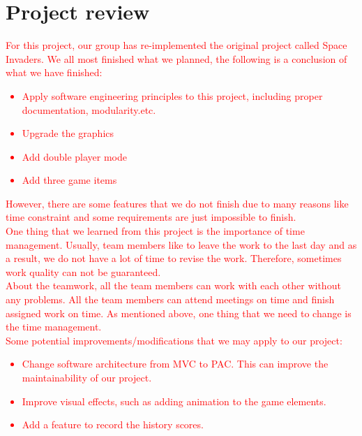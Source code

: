 \documentclass[12pt]{article}
\begin{document}
\section{Project review}
\textcolor{red}{For this project, our group has re-implemented the original project
called Space Invaders. We all most finished what we planned, the following is a 
conclusion of what we have finished:
\begin{itemize}
\item Apply software engineering principles to this project, including proper 
documentation, modularity.etc.
\item Upgrade the graphics
\item Add double player mode
\item Add three game items
\end{itemize}
However, there are some features that we do not finish due to many reasons like 
time constraint and some requirements are just impossible to finish.\\ One thing
that we learned from this project is the importance of time management. Usually, 
team members like to leave the work to the last day and as a result, we do not have
a lot of time to revise the work. Therefore, sometimes work quality can not be
guaranteed.\\ About the teamwork, all the team members can work with each other 
without any problems. All the team members can attend meetings on time and finish
assigned work on time. As mentioned above, one thing that we need to change is the
time management.\\Some potential improvements/modifications that we may apply to
our project:
\begin{itemize}
\item Change software architecture  from MVC to PAC. This can improve the maintainability of our project.
\item Improve visual effects, such as adding animation to the game elements.
\item Add a feature to record the history scores.
\end{itemize} 
}
\end{document}
